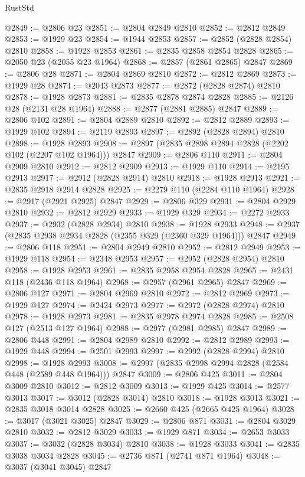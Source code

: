 \begin{lexlean}{RustStd}
\begin{coremodule}
@2849 := @2806 @23
@2851 := @2804 @2849 @2810
@2852 := @2812 @2849
@2853 := @1929 @23
@2854 := @1944 @2853
@2857 := @2852 (@2828 @2854) @2810
@2858 := @1928 @2853
@2861 := @2835 @2858 @2854 @2828
@2865 := @2050 @23 (@2055 @23 @1964)
@2868 := @2857 (@2861 @2865) @2847
@2869 := @2806 @28
@2871 := @2804 @2869 @2810
@2872 := @2812 @2869
@2873 := @1929 @28
@2874 := @2043 @2873
@2877 := @2872 (@2828 @2874) @2810
@2878 := @1928 @2873
@2881 := @2835 @2878 @2874 @2828
@2885 := @2126 @28 (@2131 @28 @1964)
@2888 := @2877 (@2881 @2885) @2847
@2889 := @2806 @102
@2891 := @2804 @2889 @2810
@2892 := @2812 @2889
@2893 := @1929 @102
@2894 := @2119 @2893
@2897 := @2892 (@2828 @2894) @2810
@2898 := @1928 @2893
@2908 := @2897 (@2835 @2898 @2894 @2828 (@2202 @102 (@2207 @102 @1964))) @2847
@2909 := @2806 @110
@2911 := @2804 @2909 @2810
@2912 := @2812 @2909
@2913 := @1929 @110
@2914 := @2195 @2913
@2917 := @2912 (@2828 @2914) @2810
@2918 := @1928 @2913
@2921 := @2835 @2918 @2914 @2828
@2925 := @2279 @110 (@2284 @110 @1964)
@2928 := @2917 (@2921 @2925) @2847
@2929 := @2806 @329
@2931 := @2804 @2929 @2810
@2932 := @2812 @2929
@2933 := @1929 @329
@2934 := @2272 @2933
@2937 := @2932 (@2828 @2934) @2810
@2938 := @1928 @2933
@2948 := @2937 (@2835 @2938 @2934 @2828 (@2355 @329 (@2360 @329 @1964))) @2847
@2949 := @2806 @118
@2951 := @2804 @2949 @2810
@2952 := @2812 @2949
@2953 := @1929 @118
@2954 := @2348 @2953
@2957 := @2952 (@2828 @2954) @2810
@2958 := @1928 @2953
@2961 := @2835 @2958 @2954 @2828
@2965 := @2431 @118 (@2436 @118 @1964)
@2968 := @2957 (@2961 @2965) @2847
@2969 := @2806 @127
@2971 := @2804 @2969 @2810
@2972 := @2812 @2969
@2973 := @1929 @127
@2974 := @2424 @2973
@2977 := @2972 (@2828 @2974) @2810
@2978 := @1928 @2973
@2981 := @2835 @2978 @2974 @2828
@2985 := @2508 @127 (@2513 @127 @1964)
@2988 := @2977 (@2981 @2985) @2847
@2989 := @2806 @448
@2991 := @2804 @2989 @2810
@2992 := @2812 @2989
@2993 := @1929 @448
@2994 := @2501 @2993
@2997 := @2992 (@2828 @2994) @2810
@2998 := @1928 @2993
@3008 := @2997 (@2835 @2998 @2994 @2828 (@2584 @448 (@2589 @448 @1964))) @2847
@3009 := @2806 @425
@3011 := @2804 @3009 @2810
@3012 := @2812 @3009
@3013 := @1929 @425
@3014 := @2577 @3013
@3017 := @3012 (@2828 @3014) @2810
@3018 := @1928 @3013
@3021 := @2835 @3018 @3014 @2828
@3025 := @2660 @425 (@2665 @425 @1964)
@3028 := @3017 (@3021 @3025) @2847
@3029 := @2806 @871
@3031 := @2804 @3029 @2810
@3032 := @2812 @3029
@3033 := @1929 @871
@3034 := @2653 @3033
@3037 := @3032 (@2828 @3034) @2810
@3038 := @1928 @3033
@3041 := @2835 @3038 @3034 @2828
@3045 := @2736 @871 (@2741 @871 @1964)
@3048 := @3037 (@3041 @3045) @2847

\end{coremodule}
\end{lexlean}
